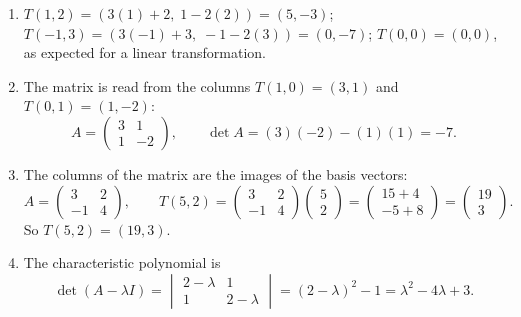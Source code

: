 \documentclass[11pt]{article}
\begin{document}
\begin{corrige}
\begin{enumerate}
\item $T(1,2)=(3(1)+2,\;1-2(2))=(5,-3)$; \quad $T(-1,3)=(3(-1)+3,\;-1-2(3))=(0,-7)$; \quad $T(0,0)=(0,0)$, as expected for a linear transformation.
\item The matrix is read from the columns $T(1,0)=(3,1)$ and $T(0,1)=(1,-2)$:
\[ A=\begin{pmatrix} 3 & 1 \\ 1 & -2 \end{pmatrix},\qquad \det A=(3)(-2)-(1)(1)=-7. \]
\item The columns of the matrix are the images of the basis vectors:
\[ A=\begin{pmatrix} 3 & 2 \\ -1 & 4 \end{pmatrix},\qquad T(5,2)=\begin{pmatrix} 3 & 2 \\ -1 & 4 \end{pmatrix}\begin{pmatrix} 5 \\ 2 \end{pmatrix}=\begin{pmatrix} 15+4 \\ -5+8 \end{pmatrix}=\begin{pmatrix} 19 \\ 3 \end{pmatrix}. \]
So $T(5,2)=(19,3)$.
\item The characteristic polynomial is
\[ \det(A-\lambda I)=\begin{vmatrix} 2-\lambda & 1 \\ 1 & 2-\lambda \end{vmatrix}=(2-\lambda)^{2}-1=\lambda^{2}-4\lambda+3. \]
\end{enumerate}
\end{corrige}
\end{document}
